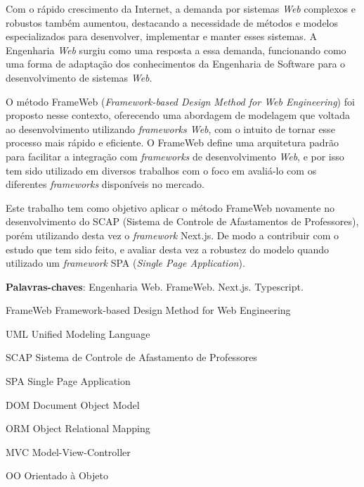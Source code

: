 \documentclass[
	12pt,				%
	openright,			%
	oneside,			%
	a4paper,			%
	english,			%
	french,				%
	spanish,			%
	brazil				%
	]{abntex2}
\begin{document}
\setlength{\absparsep}{18pt}
\begin{resumo}
  Com o rápido crescimento da Internet, a demanda por sistemas \textit{Web} complexos e robustos também
  aumentou, destacando a necessidade de métodos e modelos especializados para desenvolver, 
  implementar e manter esses sistemas. A Engenharia \textit{Web} surgiu como uma resposta a essa demanda,
  funcionando como uma forma de adaptação dos conhecimentos da Engenharia de Software para o
  desenvolvimento de sistemas \textit{Web}.

  O método FrameWeb (\textit{Framework-based Design Method for Web Engineering}) foi proposto nesse contexto,
  oferecendo uma abordagem de modelagem que voltada ao desenvolvimento utilizando \textit{frameworks Web}, com o intuito de tornar
  esse processo mais rápido e eficiente. O FrameWeb define uma arquitetura padrão para facilitar a
  integração com \textit{frameworks} de desenvolvimento \textit{Web}, e por isso tem sido utilizado em diversos trabalhos
  com o foco em avaliá-lo com os diferentes \textit{frameworks} disponíveis no mercado.

  Este trabalho tem como objetivo aplicar o método FrameWeb novamente no desenvolvimento do SCAP
  (Sistema de Controle de Afastamentos de Professores), porém utilizando desta vez o \textit{framework} Next.js. De modo a contribuir com o estudo que tem sido feito,
  e avaliar desta vez a robustez do modelo quando utilizado um \textit{framework} SPA (\textit{Single Page Application}).

\textbf{Palavras-chaves}: Engenharia Web. FrameWeb. Next.js. Typescript.
\end{resumo}

\listoffigures*
\cleardoublepage

\listoftables*
\cleardoublepage

\begin{siglas}
	\item[FrameWeb] Framework-based Design Method for Web Engineering
  \item[UML] Unified Modeling Language
  \item[SCAP] Sistema de Controle de Afastamento de Professores
  \item[SPA] Single Page Application 
  \item[DOM] Document Object Model
  \item[ORM] Object Relational Mapping
  \item[MVC] Model-View-Controller
  \item[OO] Orientado à Objeto  
\end{siglas}
\end{document}
